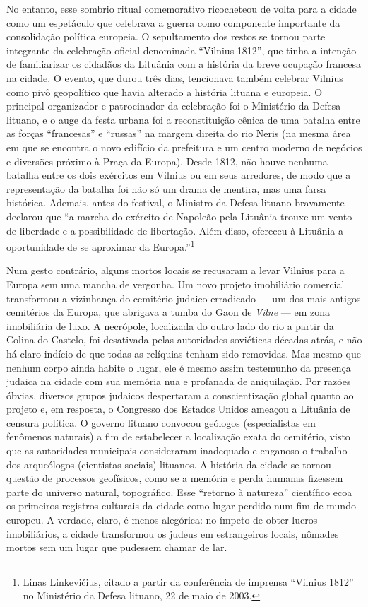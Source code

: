 No entanto, esse sombrio ritual comemorativo ricocheteou de volta para a
cidade como um espetáculo que celebrava a guerra como componente
importante da consolidação política europeia. O sepultamento dos restos
se tornou parte integrante da celebração oficial denominada ``Vilnius
1812'', que tinha a intenção de familiarizar os cidadãos da Lituânia com
a história da breve ocupação francesa na cidade. O evento, que durou
três dias, tencionava também celebrar Vilnius como pivô geopolítico que
havia alterado a história lituana e europeia. O principal organizador e
patrocinador da celebração foi o Ministério da Defesa lituano, e o auge
da festa urbana foi a reconstituição cênica de uma batalha entre as
forças ``francesas'' e ``russas'' na margem direita do rio Neris (na
mesma área em que se encontra o novo edifício da prefeitura e um centro
moderno de negócios e diversões próximo à Praça da Europa). Desde 1812,
não houve nenhuma batalha entre os dois exércitos em Vilnius ou em seus
arredores, de modo que a representação da batalha foi não só um drama de
mentira, mas uma farsa histórica. Ademais, antes do festival, o Ministro
da Defesa lituano bravamente declarou que ``a marcha do exército de
Napoleão pela Lituânia trouxe um vento de liberdade e a possibilidade de
libertação. Além disso, ofereceu à Lituânia a oportunidade de se
aproximar da Europa.''\footnote{Linas Linkevičius, citado a partir da conferência de imprensa ``Vilnius 1812'' no Ministério da Defesa lituano, 22 de maio de 2003.}

Num gesto contrário, alguns mortos locais se recusaram a levar Vilnius
para a Europa sem uma mancha de vergonha. Um novo projeto imobiliário
comercial transformou a vizinhança do cemitério judaico erradicado --- um
dos mais antigos cemitérios da Europa, que abrigava a tumba do Gaon de
\textit{Vilne} --- em zona imobiliária de luxo. A necrópole, localizada do outro
lado do rio a partir da Colina do Castelo, foi desativada pelas
autoridades soviéticas décadas atrás, e não há claro indício de que
todas as relíquias tenham sido removidas. Mas mesmo que nenhum corpo
ainda habite o lugar, ele é mesmo assim testemunho da presença judaica
na cidade com sua memória nua e profanada de aniquilação. Por razões
óbvias, diversos grupos judaicos despertaram a conscientização global
quanto ao projeto e, em resposta, o Congresso dos Estados Unidos ameaçou
a Lituânia de censura política. O governo lituano convocou geólogos
(especialistas em fenômenos naturais) a fim de estabelecer a localização
exata do cemitério, visto que as autoridades municipais consideraram
inadequado e enganoso o trabalho dos arqueólogos (cientistas sociais)
lituanos. A história da cidade se tornou questão de processos
geofísicos, como se a memória e perda humanas fizessem parte do universo
natural, topográfico. Esse ``retorno à natureza'' científico ecoa os
primeiros registros culturais da cidade como lugar perdido num fim de
mundo europeu. A verdade, claro, é menos alegórica: no ímpeto de obter
lucros imobiliários, a cidade transformou os judeus em estrangeiros
locais, nômades mortos sem um lugar que pudessem chamar de lar.

